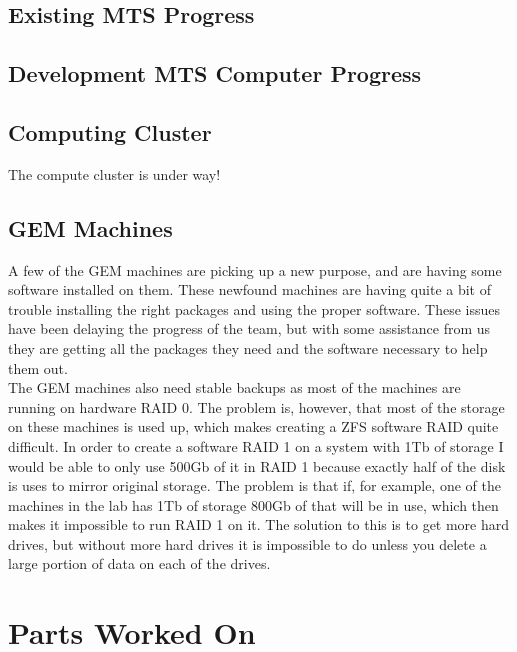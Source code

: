 \documentclass[12pt]{article}
\newcommand\tab[1][1cm]{\hspace*{#1}}
\begin{document}
\subsection{Existing MTS Progress}

\tab 

\subsection{Development MTS Computer Progress}

\tab 

\subsection{Computing Cluster}

\tab The compute cluster is under way! 

\subsection{GEM Machines}

\tab A few of the GEM machines are picking up a new purpose, and are having some software
installed on them. These newfound machines are having quite a bit of trouble installing the 
right packages and using the proper software. These issues have been delaying the progress of
the team, but with some assistance from us they are getting all the packages they need and the 
software necessary to help them out. \\

\tab The GEM machines also need stable backups as most of the machines are running on hardware
RAID 0. The problem is, however, that most of the storage on these machines is used up, which 
makes creating a ZFS software RAID quite difficult. In order to create a software RAID 1 on a system with 1Tb of storage I would be able to only use 500Gb of it in RAID 1 because exactly half
of the disk is uses to mirror original storage. The problem is that if, for example, one of the
machines in the lab has 1Tb of storage 800Gb of that will be in use, which then makes it
impossible to run RAID 1 on it. The solution to this is to get more hard drives, but without more
hard drives it is impossible to do unless you delete a large portion of data on each of the drives. 

\section{Parts Worked On}
\end{document}
